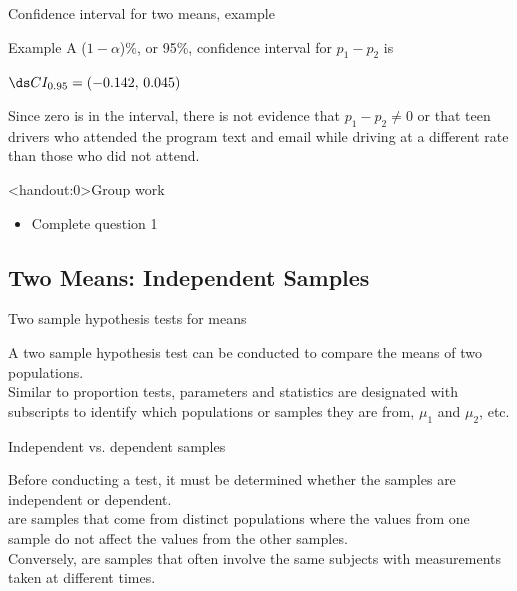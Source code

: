 \documentclass[xcolor=table]{beamer}
\begin{document}
\begin{frame}{Confidence interval for two means, example}
\begin{exampleblock}{Example}
\large
A ($1-\alpha$)\%, or 95\%, confidence interval for $p_1 - p_2$ is\\
\pause\medskip
{\centering $\ds CI_{0.95} = (-0.142, \, 0.045)$ \par}
\medskip

\pause Since zero is in the interval, there is not evidence that $p_1 - p_2 \ne 0$ or that teen drivers who attended the program text and email while driving at a different rate than those who did not attend.

\end{exampleblock}
\end{frame}

\begin{frame}<handout:0>{Group work}
\begin{block}{}
\large
\begin{itemize}
\item Complete question 1
\end{itemize}
\end{block}
\end{frame}


\subsection{Two Means: Independent Samples}

\begin{frame}{Two sample hypothesis tests for means}
\begin{block}{}
\large
A two sample hypothesis test can be conducted to compare the means of two populations.\\
\pause\medskip
Similar to proportion tests, parameters and statistics are designated with subscripts to identify which populations or samples they are from, $\mu_1$ and $\mu_2$, etc.
\end{block}
\end{frame}

\begin{frame}{Independent vs. dependent samples}
\begin{block}{}
\large
Before conducting a test, it must be determined whether the samples are independent or dependent.\\
\pause\medskip
{} are samples that come from distinct populations where the values from one sample do not affect the values from the other samples.\\
\pause\medskip
Conversely,  are samples that often involve the same subjects with measurements taken at different times.
\end{block}
\end{frame}
\end{document}

